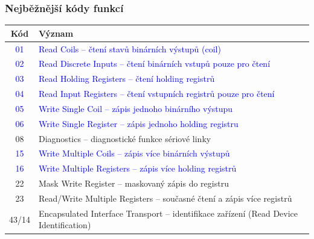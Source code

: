 	\begin{frame}
    \frametitle{Nejběžnější kódy funkcí}
		\small
		\begin{center}
			\begin{tabular}{|c|p{10cm}|}
			\hline
			\textbf{Kód} & \textbf{Význam} \\ \hline

			\textcolor{blue}{01} & \textcolor{blue}{Read Coils – čtení stavů binárních výstupů (coil)} \\ \hline

			\textcolor{blue}{02} & \textcolor{blue}{Read Discrete Inputs – čtení binárních vstupů pouze pro čtení} \\ \hline

			\textcolor{blue}{03} & \textcolor{blue}{Read Holding Registers – čtení holding registrů} \\ \hline

			\textcolor{blue}{04} & \textcolor{blue}{Read Input Registers – čtení vstupních registrů pouze pro čtení} \\ \hline

			\textcolor{blue}{05} & \textcolor{blue}{Write Single Coil – zápis jednoho binárního výstupu} \\ \hline

			\textcolor{blue}{06} & \textcolor{blue}{Write Single Register – zápis jednoho holding registru} \\ \hline

			08 & Diagnostics – diagnostické funkce sériové linky \\ \hline

			\textcolor{blue}{15} & \textcolor{blue}{Write Multiple Coils – zápis více binárních výstupů} \\ \hline

			\textcolor{blue}{16} & \textcolor{blue}{Write Multiple Registers – zápis více holding registrů} \\ \hline

			22 & Mask Write Register – maskovaný zápis do registru \\ \hline

			23 & Read/Write Multiple Registers – současné čtení a zápis více registrů \\ \hline

			43/14 & Encapsulated Interface Transport – identifikace zařízení (Read Device Identification) \\ \hline

			\end{tabular}
		\end{center}
		
	\end{frame}
	
